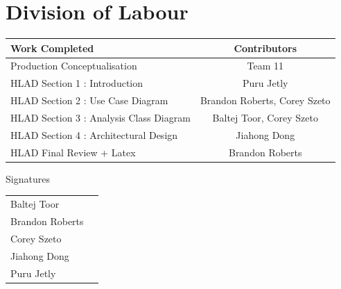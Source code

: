 \documentclass[]{article}
\begin{document}
\section{Division of Labour}
\label{sec:division_of_labour}
\begin{center}
\large
			\begin{tabular}{l|c}
				Work Completed   & Contributors \\\hline
				Production Conceptualisation &Team 11 \\
				HLAD Section 1 : Introduction & Puru Jetly \\
				HLAD Section 2 : Use Case Diagram  & Brandon Roberts, Corey Szeto \\
				HLAD Section 3 : Analysis Class Diagram  & Baltej Toor, Corey Szeto  \\
				HLAD Section 4 : Architectural Design  & Jiahong Dong \\
				HLAD Final Review + Latex  & Brandon Roberts \\
			\end{tabular}
			\vspace{0.1in}
\huge Signatures
\end{center}
			\vspace{0.3in}
\large
			\begin{tabular}{l|r}
			\vspace{1in}
				Baltej Toor  & \underline{\hspace{8cm}} \\
			\vspace{1in}
				Brandon Roberts   & \underline{\hspace{8cm}} \\
			\vspace{1in}
				Corey Szeto  & \underline{\hspace{8cm}} \\
			\vspace{1in}
				Jiahong Dong   & \underline{\hspace{8cm}} \\
			\vspace{1in}
				Puru Jetly   & \underline{\hspace{8cm}} \\
			\end{tabular}



\newpage
\end{document}
